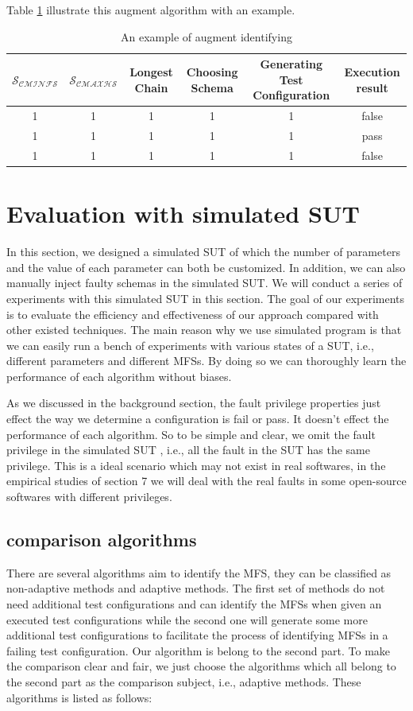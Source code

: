 \documentclass[10pt,journal,cspaper,compsoc]{IEEEtran}
\begin{document}
Table \ref{augment_example} illustrate this augment algorithm with an example.
\begin{table}\renewcommand{\arraystretch}{1.3}
  \caption{An example of augment identifying} \centering
  \label{augment_example}
  \begin{tabular}{c|c|c|c|c|c}\hline
  \hline
  \bfseries $\mathcal{S_{CMINFS}}$ &   \bfseries $\mathcal{S_{CMAXHS}}$ & \bfseries Longest Chain & \bfseries Choosing Schema & \bfseries Generating Test Configuration & \bfseries Execution result\\
  \hline
  1 & 1 & 1 & 1 & 1 & false \\
   1 & 1 & 1 & 1 & 1 & pass\\
  1 & 1 & 1 & 1 & 1 & false\\
  \hline
  \end{tabular}

\end{table}

\section{Evaluation with simulated SUT} \label{sec:simulateEx}
In this section, we designed a simulated SUT of which the number of parameters and the value of each parameter can both be customized. In addition, we can also manually inject faulty schemas in the simulated SUT. We will conduct a series of experiments with this simulated SUT in this section. The goal of our experiments is to evaluate the efficiency and effectiveness of our approach compared with other existed techniques. The main reason why we use simulated program is that we can easily run a bench of experiments with various states of a SUT, i.e., different parameters and different MFSs. By doing so we can thoroughly learn the performance of each algorithm without biases.

As we discussed in the background section, the fault privilege properties just effect the way we determine a configuration is fail or pass. It doesn't effect the performance of each algorithm. So to be simple and clear, we omit the fault privilege in the simulated SUT , i.e., all the fault in the SUT has the same privilege. This is a ideal scenario which may not exist in real softwares, in the empirical studies of section 7 we will deal with the real faults in some open-source softwares with different privileges.
\subsection{comparison algorithms}
There are several algorithms aim to identify the MFS, they can be classified as non-adaptive methods and adaptive methods. The first set of methods do not need additional test configurations and can identify the MFSs when given an executed test configurations while the second one will generate some more additional test configurations to facilitate the process of identifying MFSs in a failing test configuration. Our algorithm is belong to the second part. To make the comparison clear and fair, we just choose the algorithms which all belong to the second part as the comparison subject, i.e., adaptive methods. These algorithms is listed as follows:
\end{document}
